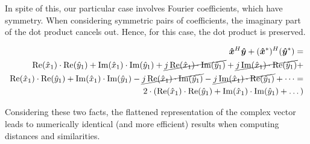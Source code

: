 \documentclass[../main.tex]{subfiles}
\begin{document}
In spite of this, our particular case involves Fourier coefficients, which have symmetry. When considering symmetric pairs of coefficients, the imaginary part of the dot product cancels out. Hence, for this case, the dot product is preserved.

\begin{equation}
\begin{split}
    \bm{\hat{x}}^H\bm{\hat{y}} + (\bm{\hat{x}}^*)^H(\bm{\hat{y}}^*) =\\
    \Re(\hat{x}_1) \cdot \Re(\hat{y}_1) + \Im(\hat{x}_1) \cdot \Im(\hat{y}_1) + \cancel{j \Re(\hat{x}_1) \cdot \Im(\hat{y}_1)} + \cancel{j\Im(\hat{x}_1) \cdot \Re(\hat{y}_1)} +\\ 
    \Re(\hat{x}_1) \cdot \Re(\hat{y}_1) + \Im(\hat{x}_1) \cdot \Im(\hat{y}_1) - \cancel{j \Re(\hat{x}_1) \cdot \Im(\hat{y}_1)} - \cancel{j\Im(\hat{x}_1) \cdot \Re(\hat{y}_1)} + \dots =\\ 
    2 \cdot (\Re(\hat{x}_1) \cdot \Re(\hat{y}_1) + \Im(\hat{x}_1) \cdot \Im(\hat{y}_1) + \dots)
\end{split}
\end{equation}

Considering these two facts, the flattened representation of the complex vector leads to numerically identical (and more efficient) results when computing distances and similarities.
\end{document}
